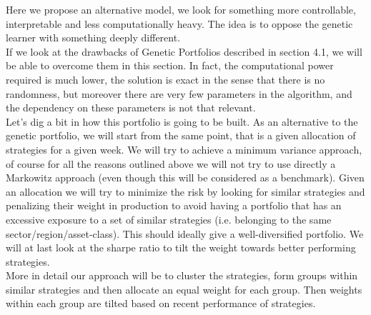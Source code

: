Here we propose an alternative model, we look for something more controllable, interpretable and less computationally heavy. The idea is to oppose the genetic learner with something deeply different.\\
If we look at the drawbacks of Genetic Portfolios described in section 4.1, we will be able to overcome them in this section. In fact, the computational power required is much lower, the solution is exact in the sense that there is no randomness, but moreover there are very few parameters in the algorithm, and the dependency on these parameters is not that relevant.\\
Let's dig a bit in how this portfolio is going to be built. As an alternative to the genetic portfolio, we will start from the same point, that is a given allocation of strategies for a given week. We will try to achieve a minimum variance approach, of course for all the reasons outlined above we will not try to use directly a Markowitz approach (even though this will be considered as a benchmark). Given an allocation we will try to minimize the risk by looking for similar strategies and penalizing their weight in production to avoid having a portfolio that has an excessive exposure to a set of similar strategies (i.e. belonging to the same sector/region/asset-class). This should ideally give a well-diversified portfolio. We will at last look at the sharpe ratio to tilt the weight towards better performing strategies.\\
More in detail our approach will be to cluster the strategies, form groups within similar strategies and then allocate an equal weight for each group. Then weights within each group are tilted based on recent performance of strategies.

